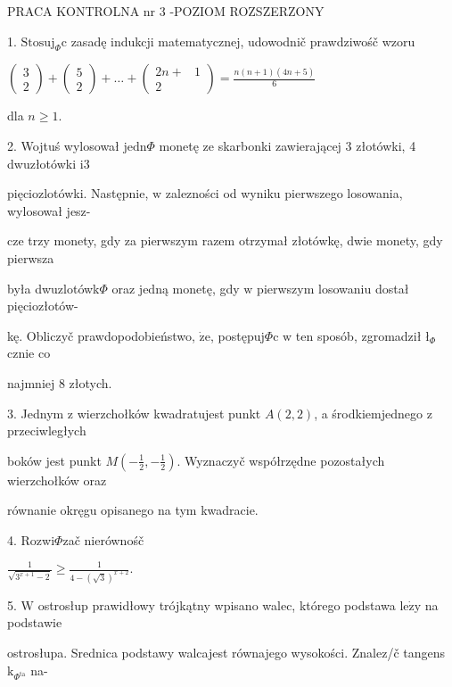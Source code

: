 \documentclass[a4paper,12pt]{article}
\begin{document}
PRACA KONTROLNA nr 3 -POZIOM ROZSZERZONY

1. $\mathrm{S}\mathrm{t}\mathrm{o}\mathrm{s}\mathrm{u}\mathrm{j}_{\Phi}\mathrm{c}$ zasadę indukcji matematycznej, udowodnič prawdziwośč wzoru

$\left(\begin{array}{l}
3\\
2
\end{array}\right) + \left(\begin{array}{l}
5\\
2
\end{array}\right) +\ldots+\left(\begin{array}{ll}
2n+ & 1\\
2 & 
\end{array}\right) =\displaystyle \frac{n(n+1)(4n+5)}{6}$

dla $n\geq 1.$

2. Wojtuś wylosował $\mathrm{j}\mathrm{e}\mathrm{d}\mathrm{n}\Phi$ monetę ze skarbonki zawierającej 3 złotówki, 4 dwuzłotówki $\mathrm{i}3$

pięciozlotówki. Następnie, $\mathrm{w}$ zalezności od wyniku pierwszego losowania, wylosował jesz-

cze trzy monety, gdy za pierwszym razem otrzymał złotówkę, dwie monety, gdy pierwsza

była dwuzlotówk$\Phi$ oraz jedną monetę, gdy $\mathrm{w}$ pierwszym losowaniu dostał pięciozłotów-

kę. Obliczyč prawdopodobieństwo, $\dot{\mathrm{z}}\mathrm{e}$, postępuj$\Phi$c $\mathrm{w}$ ten sposób, zgromadził $\text{ł}_{\Phi}$cznie co

najmniej 8 złotych.

3. Jednym $\mathrm{z}$ wierzchołków kwadratujest punkt $A(2,2)$, a środkiemjednego $\mathrm{z}$ przeciwległych

boków jest punkt $M(-\displaystyle \frac{1}{2},-\frac{1}{2})$. Wyznaczyč współrzędne pozostałych wierzchołków oraz

równanie okręgu opisanego na tym kwadracie.

4. Rozwi$\Phi$zač nierównośč

$\displaystyle \frac{1}{\sqrt{3^{x+1}-2}}\geq\frac{1}{4-(\sqrt{3})^{x+2}}.$

5. $\mathrm{W}$ ostrosłup prawidłowy trójkątny wpisano walec, którego podstawa $\mathrm{l}\mathrm{e}\dot{\mathrm{z}}\mathrm{y}$ na podstawie

ostrosłupa. Srednica podstawy walcajest równajego wysokości. Znalez/č tangens $\mathrm{k}_{\Phi^{\mathrm{t}\mathrm{a}}}$ na-
\end{document}
